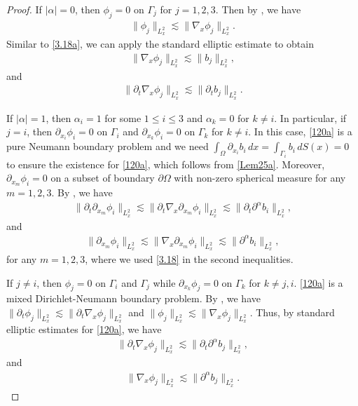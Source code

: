 \documentclass[reqno,a4paper]{amsart}
\numberwithin{equation}{section}
\newcommand{\1}{\mathbf{1}}
\newcommand{\pa}{\partial}
\newcommand{\na}{\nabla}
\newcommand{\<}{\langle}
\renewcommand{\>}{\rangle}
\begin{document}
\begin{proof}
	If $|\alpha|=0$, then $\phi_j=0$ on $\Gamma_j$ for $j=1,2,3$. Then by \cite[Theorem 6.7-5]{Ciarlet2013}, we have 
	\begin{align*}
		\|\phi_j\|_{L^2_x}\lesssim \|\na_x\phi_j\|_{L^2_x}. 
	\end{align*}
	Similar to \eqref{3.18a}, we can apply the standard elliptic estimate to obtain 
	\begin{align}\label{3.24}
		\|\na_x\phi_j\|_{L^2_x}\lesssim \|b_j\|_{L^2_x},
	\end{align}
and 
\begin{align}\label{3.24a}
	\|\pa_t\na_x\phi_j\|_{L^2_x}\lesssim \|\pa_tb_j\|_{L^2_x}.
\end{align}
	
	
	If $|\alpha|=1$, then $\alpha_i=1$ for some $1\le i\le 3$ and $\alpha_k=0$ for $k\neq i$. 
		In particular, if $j=i$, then $\partial_{x_i}\phi_i=0$ on $\Gamma_i$ and $\partial_{x_k}\phi_i=0$ on $\Gamma_k$ for $k\neq i$. In this case, \eqref{120a} is a pure Neumann boundary problem and we need $\int_{\Omega}\partial_{x_i}b_i\,dx=\int_{\Gamma_i}b_i\,dS(x)=0$ to ensure the existence for \eqref{120a}, which follows from \eqref{Lem25a}. Moreover, $\pa_{x_m}\phi_i=0$ on a subset of boundary $\partial\Omega$ with non-zero spherical measure for any $m=1,2,3$. 
	By \cite[Theorem 6.7-5]{Ciarlet2013}, we have 
	\begin{align}\label{3.21a}
		\|\partial_t\partial_{x_m}\phi_i\|_{L^2_x}\lesssim \|\partial_t\na_x\partial_{x_m}\phi_i\|_{L^2_x}
		\lesssim \|\partial_t\partial^\alpha b_i\|_{L^2_x},
	\end{align} and 
	\begin{align}\label{3.21}
		\|\partial_{x_m}\phi_i\|_{L^2_x}\lesssim \|\na_x\partial_{x_m}\phi_i\|_{L^2_x}\lesssim \|\partial^\alpha b_i\|_{L^2_x},
	\end{align}for any $m=1,2,3$, where we used \eqref{3.18} in the second inequalities.
	
	
	If $j\neq i$, then $\phi_j=0$ on $\Gamma_i$ and $\Gamma_j$ while $\partial_{x_k}\phi_j=0$ on $\Gamma_k$ for $k\neq j,i$. \eqref{120a} is a mixed Dirichlet-Neumann boundary problem. By \cite[Theorem 6.7-5]{Ciarlet2013}, we have $\|\partial_t\phi_j\|_{L^2_x}\lesssim \|\partial_t\na_x\phi_j\|_{L^2_x}$ and $\|\phi_j\|_{L^2_x}\lesssim \|\na_x\phi_j\|_{L^2_x}$. Thus, by standard elliptic estimates for \eqref{120a}, we have 
	\begin{align}\label{3.21b}
		\|\partial_t\na_x\phi_j\|_{L^2_x}\lesssim \|\partial_t\partial^\alpha b_j\|_{L^2_x},
	\end{align}
	and 
	\begin{align}\label{3.21c}
		\|\na_x\phi_j\|_{L^2_x}\lesssim \|\partial^\alpha b_j\|_{L^2_x}.
	\end{align}
	

\end{proof}
\end{document}
